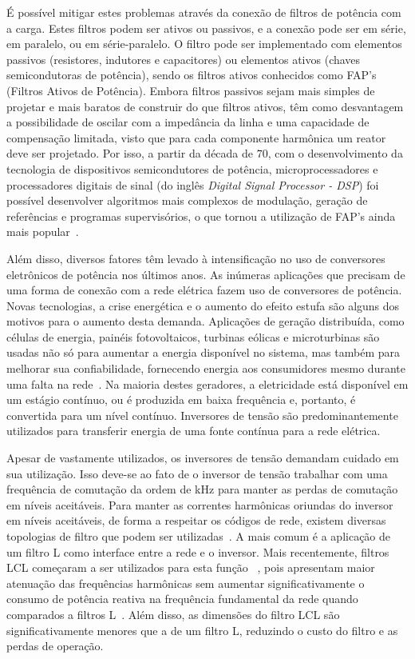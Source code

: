 	É possível mitigar estes problemas através da conexão de filtros de potência com a carga. Estes filtros podem ser ativos ou passivos, e a conexão pode ser em série, em paralelo, ou em série-paralelo. O filtro pode ser implementado com elementos passivos (resistores, indutores e capacitores) ou elementos ativos (chaves semicondutoras de potência), sendo os filtros ativos conhecidos como FAP's (Filtros Ativos de Potência). Embora filtros passivos sejam mais simples de projetar e mais baratos de construir do que filtros ativos, têm como desvantagem a possibilidade de oscilar com a impedância da linha e uma capacidade de compensação limitada, visto que para cada componente harmônica um reator deve ser projetado. Por isso, a partir da década de $70$, com o desenvolvimento da tecnologia de dispositivos semicondutores de potência, microprocessadores e processadores digitais de sinal (do inglês \emph{Digital Signal Processor - DSP}) foi possível desenvolver algoritmos mais complexos de modulação, geração de referências e programas supervisórios, o que tornou a utilização de FAP's ainda mais popular~\cite{ref:SASAKI}.

	Além disso, diversos fatores têm levado à intensificação no uso de conversores eletrônicos	de potência nos últimos anos. As inúmeras aplicações que precisam de uma forma de conexão com a rede elétrica fazem uso de conversores de potência. Novas tecnologias, a crise energética e o aumento do efeito estufa são alguns dos motivos para o aumento desta demanda. Aplicações de geração distribuída, como células de energia,	painéis fotovoltaicos, turbinas eólicas e microturbinas são usadas não só para aumentar a energia disponível no sistema, mas também para melhorar sua confiabilidade, fornecendo energia aos consumidores mesmo durante uma falta na rede~\cite{ref:KARSHENAS}.	Na maioria destes geradores, a eletricidade está disponível em um estágio contínuo, ou é produzida em baixa frequência e, portanto, é convertida para um nível contínuo. Inversores de tensão são predominantemente utilizados para transferir energia de uma fonte contínua para a rede elétrica.

	Apesar de vastamente utilizados, os inversores de tensão demandam cuidado em sua utilização. Isso deve-se ao fato de o inversor de tensão trabalhar com uma frequência de comutação da ordem de kHz para manter as perdas de comutação em níveis aceitáveis. Para manter as correntes harmônicas oriundas do inversor em níveis aceitáveis, de forma a respeitar os códigos de rede, existem diversas topologias de filtro que podem ser utilizadas~\cite{ref:RIBEIRO}. A mais comum é a aplicação de um filtro L como interface entre a rede e o inversor. Mais recentemente, filtros LCL começaram a ser utilizados para esta função~\cite{ref:LINDGREN}\cite{ref:TEODORESCU} \cite{ref:XU}, pois apresentam maior atenuação das frequências harmônicas sem aumentar significativamente o consumo de potência reativa na frequência fundamental da rede quando comparados a filtros L~\cite{ref:FUCHS}. Além disso, as dimensões do filtro LCL são significativamente menores que a de um filtro L, reduzindo o custo do filtro e as perdas de operação.


